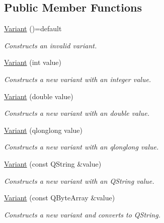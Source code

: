 \subsection*{Public Member Functions}
\begin{DoxyCompactItemize}
\item 
\mbox{\label{class_variant_a594b84b7c7a7e997aac3354bbdaa2d97}} 
\hyperlink{class_variant_a594b84b7c7a7e997aac3354bbdaa2d97}{Variant} ()=default
\begin{DoxyCompactList}\small\item\em Constructs an invalid variant. \end{DoxyCompactList}\item 
\mbox{\label{class_variant_a1015564e64eb9bc9ce894fb1f98b6e36}} 
\hyperlink{class_variant_a1015564e64eb9bc9ce894fb1f98b6e36}{Variant} (int value)
\begin{DoxyCompactList}\small\item\em Constructs a new variant with an integer value. \end{DoxyCompactList}\item 
\mbox{\label{class_variant_a7e7d9a46e166e059ce75b76b92b11457}} 
\hyperlink{class_variant_a7e7d9a46e166e059ce75b76b92b11457}{Variant} (double value)
\begin{DoxyCompactList}\small\item\em Constructs a new variant with an double value. \end{DoxyCompactList}\item 
\mbox{\label{class_variant_a6f86cea152e761f48700e41f210fe251}} 
\hyperlink{class_variant_a6f86cea152e761f48700e41f210fe251}{Variant} (qlonglong value)
\begin{DoxyCompactList}\small\item\em Constructs a new variant with an qlonglong value. \end{DoxyCompactList}\item 
\mbox{\label{class_variant_a2a2d8b7cc035142a795f86d481adde0c}} 
\hyperlink{class_variant_a2a2d8b7cc035142a795f86d481adde0c}{Variant} (const Q\+String \&value)
\begin{DoxyCompactList}\small\item\em Constructs a new variant with an Q\+String value. \end{DoxyCompactList}\item 
\mbox{\label{class_variant_af11a005d444e0879b6a479bca786b19e}} 
\hyperlink{class_variant_af11a005d444e0879b6a479bca786b19e}{Variant} (const Q\+Byte\+Array \&value)
\begin{DoxyCompactList}\small\item\em Constructs a new variant and converts to Q\+String. \end{DoxyCompactList}\end{DoxyCompactItemize}


